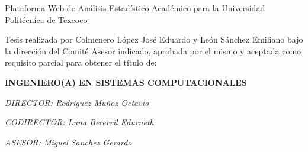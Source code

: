 
\begin{center}


    {\Huge Plataforma Web de Análisis Estadístico Académico para la Universidad Politécnica de Texcoco}
\end{center}
\vspace{3cm}
Tesis realizada por Colmenero López José Eduardo y León Sánchez Emiliano bajo la dirección del Comité Asesor indicado, aprobada por el mismo y aceptada como requisito parcial para obtener el título de:
\vspace{2cm}

\begin{center}
    {\textbf{ \large{INGENIERO(A) EN SISTEMAS COMPUTACIONALES}}}
\end{center}


\vspace{4cm}

\textit{DIRECTOR: Rodriguez Muñoz Octavio}

\textit{CODIRECTOR: Luna Becerril Edurneth}

\textit{ASESOR:  Miguel Sanchez Gerardo}